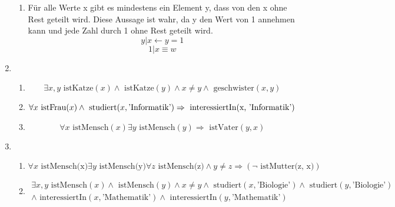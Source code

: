 \documentclass[a4paper]{article}
\begin{document}
\begin{enumerate}
\begin{enumerate}
			
			\item
			Für alle Werte x gibt es mindestens ein Element y, dass von den x ohne Rest geteilt wird.
			\newline
			Diese Aussage ist wahr, da y den Wert von 1 annehmen kann und jede Zahl durch 1 ohne Rest geteilt wird.
			\begin{equation*}
				y | x \leftarrow y = 1
			\end{equation*}
			\begin{equation*}
				1 | x \equiv w
			\end{equation*}
		\end{enumerate}
		
		\item
		\begin{enumerate}
			\item
			\begin{equation*}
				\exists x, y \text{ istKatze}(x) \land \text{ istKatze}(y) \land x \neq y \land \text{ geschwister}(x, y)
			\end{equation*}
			
			\item
			\begin{equation*}
				\forall x \text{ istFrau}(x) \land \text{ studiert}(x, \text{'Informatik'}) \Rightarrow \text{ interessiertIn(x, \text{'Informatik'})}
			\end{equation*}
			
			\item
			\begin{equation*}
				\forall x \text{ istMensch}(x) \exists y \text{ istMensch}(y) \Rightarrow \text{ istVater}(y, x)
			\end{equation*}
		\end{enumerate}
		
		\item
		\begin{enumerate}
			\item
			\begin{equation*}
				\forall x \text{ istMensch(x)} \exists y \text{ istMensch(y)} \forall z \text{ istMensch(z)} \land y \neq z \Rightarrow (\lnot \text{ istMutter(z, x)})
			\end{equation*}
			
			\item
			\begin{equation*}
				\begin{aligned}
					\exists x, y \text{ istMensch}(x) \land \text{ istMensch}(y) \land x \neq y \land \text{ studiert}(x, \text{'Biologie'}) \land \text{ studiert}(y, \text{'Biologie'}) \\ \land \text{ interessiertIn}(x, \text{'Mathematik'}) \land \text{ interessiertIn}(y, \text{'Mathematik'})
				\end{aligned}
			\end{equation*}
			

\end{enumerate}
\end{enumerate}
\end{document}
